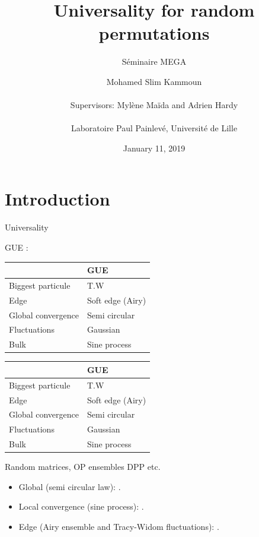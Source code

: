 \documentclass[english,xcolor=table]{beamer}
\title{Universality for random permutations}
\subtitle {Séminaire MEGA}
\author 
{ \large{Mohamed Slim Kammoun}
\\  \ \\ \large{Supervisors:  Mylène Maïda  and Adrien Hardy}
\\ \ \\ {Laboratoire Paul Painlevé, Université de Lille}
}
\date {  January 11, 2019}
\begin{document}
\begin{frame}
  \titlepage  
\end{frame}



\section*{Introduction}
\begin{frame}{Universality}
 \begin{overprint}
GUE :
\begin{table}[]
\begin{tabular}{|l|l|}
\hline
                   & GUE              \\ \hline
Biggest particule  & T.W              \\ \hline
Edge               & Soft edge (Airy) \\ \hline
Global convergence & Semi circular    \\ \hline
Fluctuations       & Gaussian         \\ \hline
Bulk               & Sine process     \\ \hline
\end{tabular}
\end{table}


\begin{table}[]
\begin{tabular}{|l|l|}
\hline
                   & GUE              \\ \hline
Biggest particule  & T.W              \\ \hline
Edge               & Soft edge (Airy) \\ \hline
Global convergence & Semi circular    \\ \hline
Fluctuations       & Gaussian         \\ \hline
Bulk               & Sine process     \\ \hline
\end{tabular}
\end{table}
Random matrices, OP ensembles DPP etc. 
    \begin{itemize}
        \item Global (semi circular law): 
        \cite{10.2307/1970008,Pastur1972}. 
        \item Local convergence (sine process): \cite*{MR2411912,Erdos2010}.
        \item Edge (Airy ensemble and Tracy-Widom fluctuations): \cite{tao2011}.
     

\end{itemize}
\end{overprint}
\end{frame}
\end{document}
